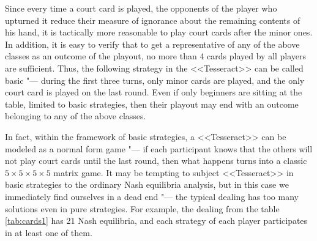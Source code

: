 Since every time a court card is played, the opponents of the player who upturned it reduce their measure of ignorance about the remaining contents of his hand, it is tactically more reasonable to play court cards after the minor ones. In addition, it is easy to verify that to get a representative of any of the above classes as an outcome of the playout, no more than 4 cards played by all players are sufficient. Thus, the following strategy in the <<Tesseract>> can be called basic "--- during the first three turns, only minor cards are played, and the only court card is played on the last round. Even if only beginners are sitting at the table, limited to basic strategies, then their playout may end with an outcome belonging to any of the above classes. %

In fact, within the framework of basic strategies, a <<Tesseract>> can be modeled as a normal form game "--- if each participant knows that the others will not play court cards until the last round, then what happens turns into a classic $5 \times 5 \times 5 \times 5$ matrix game. It may be tempting to subject <<Tesseract>> in basic strategies to the ordinary Nash equilibria analysis, but in this case we immediately find ourselves in a dead end "--- the typical dealing has too many solutions even in pure strategies. For example, the dealing from the table \ref{tab:cards1} has 21 Nash equilibria, and each strategy of each player participates in at least one of them. %

